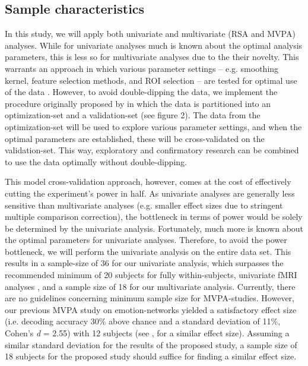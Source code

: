 \documentclass[12pt,a4paper]{article}\usepackage[]{graphicx}\usepackage[]{color}
\begin{document}
\subsection{Sample characteristics}
In this study, we will apply both univariate and multivariate (RSA and MVPA) analyses. While for univariate analyses much is known about the optimal analysis parameters, this is less so for multivariate analyses due to the their novelty. This warrants an approach in which various parameter settings -- e.g. smoothing kernel, feature selection methods, and ROI selection -- are tested for optimal use of the data \citep{kragel2012}. However, to avoid double-dipping the data, we implement the procedure originally proposed by \cite{kriegeskorte2009} in which the data is partitioned into an optimization-set and a validation-set (see figure 2). The data from the optimization-set will be used to explore various parameter settings, and when the optimal parameters are established, these will be cross-validated on the validation-set. This way, exploratory and confirmatory research can be combined to use the data optimally without double-dipping. 

This model cross-validation approach, however, comes at the cost of effectively cutting the experiment's power in half. As univariate analyses are generally less sensitive than multivariate analyses (e.g. smaller effect sizes due to stringent multiple comparison correction), the bottleneck in terms of power would be solely be determined by the univariate analysis. Fortunately, much more is known about the optimal parameters for univariate analyses. Therefore, to avoid the power bottleneck, we will perform the univariate analysis on the entire data set. This results in a sample-size of 36 for our univariate analysis, which surpasses the recommended minimum of 20 subjects for fully within-subjects, univariate fMRI analyses \citep{desmond2002}, and a sample size of 18 for our multivariate analysis. Currently, there are no guidelines concerning minimum sample size for MVPA-studies. However, our previous MVPA study on emotion-networks \citep{oosterwijk2015} yielded a satisfactory effect size (i.e. decoding accuracy 30\% above chance and a standard deviation of 11\%, Cohen's \emph{d} = 2.55) with 12 subjects (see \citealp{baucom2012}, for a similar effect size). Assuming a similar standard deviation for the results of the proposed study, a sample size of 18 subjects for the proposed study should suffice for finding a similar effect size.
\end{document}
